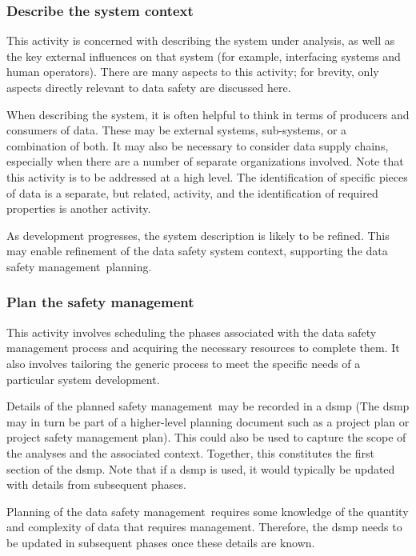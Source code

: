 \subsubsection{Describe the system context}
This activity is concerned with describing the system under analysis, as well as the key external influences on that system (for example, interfacing systems and human operators). There are many aspects to this activity; for brevity, only aspects directly relevant to data safety are discussed here.

When describing the system, it is often helpful to think in terms of producers and consumers of data. These may be external systems, sub-systems, or a combination of both. It may also be necessary to consider data supply chains, especially when there are a number of separate organizations involved. Note that this activity is to be addressed at a high level. The identification of specific pieces of data is a separate, but related, activity, and the identification of required properties is another activity.

As development progresses, the system description is likely to be refined. This may enable refinement of the data safety system context, supporting the \cbstart data safety management\cbend\ planning.

\subsubsection{Plan the safety management}
This activity involves scheduling the phases associated with the data safety management process and acquiring the necessary resources to complete them. It also involves \gls{tailoring} the generic process to meet the specific needs of a particular system development. 

Details of the planned \cbstart safety management\cbend\ may be recorded in a \gls{dsmp} \cbstart(The \gls{dsmp} may in turn be part of a higher-level planning document such as a project plan or project safety management plan)\cbend. This could also be used to capture the scope of the analyses and the associated context. Together, this constitutes the first section of the \gls{dsmp}. Note that if a \gls{dsmp} is used, it would typically be updated with details from subsequent phases. 

Planning of the \cbstart data safety management\cbend\ requires some knowledge of the quantity and complexity of data that requires \cbstart management\cbend. Therefore, the \gls{dsmp} needs to be updated in subsequent phases once these details are known.

